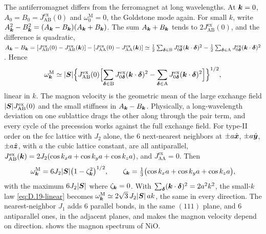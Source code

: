 The antiferromagnet differs from the ferromagnet at long wavelengths. At $\bm{k} = 0$, $A_0 = B_0 = J^{\mathrm{ex}}_{\mathrm{AB}}(0)$ and $\omega^{\mathrm{M}}_0 = 0$, the Goldstone mode again. For small $k$, write $A_{\bm{k}}^2 - B_{\bm{k}}^2 = (A_{\bm{k}} - B_{\bm{k}})(A_{\bm{k}} + B_{\bm{k}})$. The sum $A_{\bm{k}} + B_{\bm{k}}$ tends to $2J^{\mathrm{ex}}_{\mathrm{AB}}(0)$, and the difference is quadratic, $A_{\bm{k}} - B_{\bm{k}} = [J^{\mathrm{ex}}_{\mathrm{AB}}(0) - J^{\mathrm{ex}}_{\mathrm{AB}}(\bm{k})] - [J^{\mathrm{ex}}_{\mathrm{AA}}(0) - J^{\mathrm{ex}}_{\mathrm{AA}}(\bm{k})] \simeq \frac12\sum_{\bm{\delta}\in\mathrm{B}}J^{\mathrm{ex}}_{0\bm{\delta}}(\bm{k}\cdot\bm{\delta})^2 - \frac12\sum_{\bm{\delta}\in\mathrm{A}}J^{\mathrm{ex}}_{0\bm{\delta}}(\bm{k}\cdot\bm{\delta})^2$. Hence
\begin{equation}
  \omega^{\mathrm{M}}_{\bm{k}} \simeq |\bm{S}|\Bigl\{J^{\mathrm{ex}}_{\mathrm{AB}}(0)\Bigl[\sum_{\bm{\delta}\in\mathrm{B}}J^{\mathrm{ex}}_{0\bm{\delta}}(\bm{k}\cdot\bm{\delta})^2 - \sum_{\bm{\delta}\in\mathrm{A}}J^{\mathrm{ex}}_{0\bm{\delta}}(\bm{k}\cdot\bm{\delta})^2\Bigr]\Bigr\}^{1/2} ,
  \label{eq:D.19-linear}
\end{equation}
linear in $k$. The magnon velocity is the geometric mean of the large exchange field $|\bm{S}|J^{\mathrm{ex}}_{\mathrm{AB}}(0)$ and the small stiffness in $A_{\bm{k}} - B_{\bm{k}}$. Physically, a long-wavelength deviation on one sublattice drags the other along through the pair term, and every cycle of the precession works against the full exchange field. For type-II order on the fcc lattice with $J_2$ alone, the 6 next-nearest neighbors at $\pm a\hat{\bm{x}}$, $\pm a\hat{\bm{y}}$, $\pm a\hat{\bm{z}}$, with $a$ the cubic lattice constant, are all antiparallel, $J^{\mathrm{ex}}_{\mathrm{AB}}(\bm{k}) = 2J_2(\cos k_xa + \cos k_ya + \cos k_za)$, and $J^{\mathrm{ex}}_{\mathrm{AA}} = 0$. Then
\begin{equation}
  \omega^{\mathrm{M}}_{\bm{k}} = 6J_2|\bm{S}|\bigl(1 - \zeta_{\bm{k}}^2\bigr)^{1/2}, \qquad \zeta_{\bm{k}} = \tfrac13\bigl(\cos k_xa + \cos k_ya + \cos k_za\bigr) ,
  \label{eq:7.1-J2}
\end{equation}
with the maximum $6J_2|\bm{S}|$ where $\zeta_{\bm{k}} = 0$. With $\sum_{\bm{\delta}}(\bm{k}\cdot\bm{\delta})^2 = 2a^2k^2$, the small-$k$ law \cref{eq:D.19-linear} becomes $\omega^{\mathrm{M}}_{\bm{k}} \simeq 2\sqrt3\,J_2|\bm{S}|\,ak$, the same in every direction. The nearest-neighbor $J_1$ adds 6 parallel bonds, in the same $(111)$ plane, and 6 antiparallel ones, in the adjacent planes, and makes the magnon velocity depend on direction.  shows the magnon spectrum of NiO.

